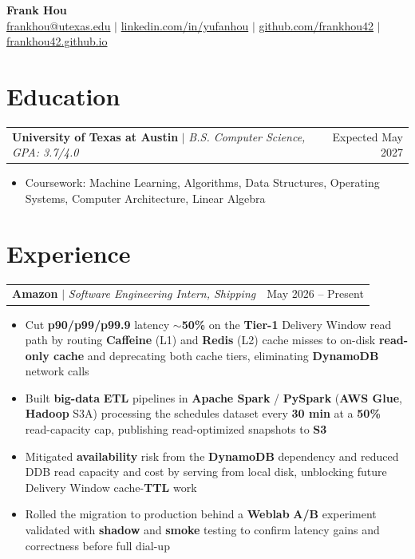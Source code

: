 \documentclass[letterpaper,10pt]{article}
\makeatletter
\newcommand{\resumeWorkHeading}[2]{%
  \vspace{2pt}\noindent
  \begin{tabular*}{\textwidth}{@{}l@{\extracolsep{\fill}}r@{}}
    #1 & #2 \\
  \end{tabular*}%
  \vspace{-2pt}
}
\newcommand{\resumeItemListStart}{\begin{itemize}}
\newcommand{\resumeItemListEnd}{\end{itemize}\vspace{3pt}}
\newcommand{\resumeItem}[1]{\item #1}
\makeatother
\begin{document}
\begin{center}
  {\huge \textbf{Frank Hou}} \\[2pt]
  \small
  \href{mailto:frankhou@utexas.edu}{frankhou@utexas.edu} $|$
  \href{https://linkedin.com/in/yufanhou}{linkedin.com/in/yufanhou} $|$
  \href{https://github.com/frankhou42}{github.com/frankhou42} $|$
  \href{https://frankhou42.github.io/}{frankhou42.github.io}
\end{center}
\vspace{-4pt}

\section{Education}
\resumeWorkHeading
{\textbf{University of Texas at Austin} $|$ \emph{B.S. Computer Science, GPA: 3.7/4.0}}{Expected May 2027}
\resumeItemListStart
\resumeItem{Coursework: Machine Learning, Algorithms, Data Structures, Operating Systems, Computer Architecture, Linear Algebra}
\resumeItemListEnd

\section{Experience}
\resumeWorkHeading
{\textbf{Amazon} $|$ \emph{Software Engineering Intern, Shipping}}{May 2026 -- Present}
\resumeItemListStart
\resumeItem{Cut \textbf{p90/p99/p99.9} latency \textbf{$\sim$50\%} on the \textbf{Tier-1} Delivery Window read path by routing \textbf{Caffeine} (L1) and \textbf{Redis} (L2) cache misses to on-disk \textbf{read-only cache} and deprecating both cache tiers, eliminating \textbf{DynamoDB} network calls}
\resumeItem{Built \textbf{big-data} \textbf{ETL} pipelines in \textbf{Apache Spark} / \textbf{PySpark} (\textbf{AWS Glue}, \textbf{Hadoop} S3A) processing the schedules dataset every \textbf{30 min} at a \textbf{50\%} read-capacity cap, publishing read-optimized snapshots to \textbf{S3}}
\resumeItem{Mitigated \textbf{availability} risk from the \textbf{DynamoDB} dependency and reduced DDB read capacity and cost by serving from local disk, unblocking future Delivery Window cache-\textbf{TTL} work}
\resumeItem{Rolled the migration to production behind a \textbf{Weblab} \textbf{A/B} experiment validated with \textbf{shadow} and \textbf{smoke} testing to confirm latency gains and correctness before full dial-up}
\resumeItemListEnd
\end{document}
